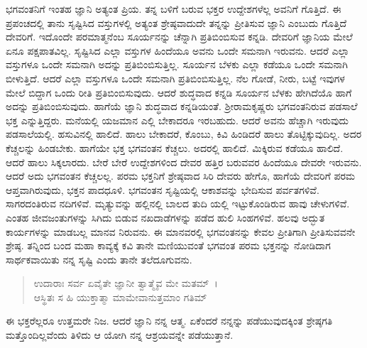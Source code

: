 ಭಗವಂತನಿಗೆ ಇಂತಹ ಜ್ಞಾನಿ ಅತ್ಯಂತ ಪ್ರಿಯ. ತನ್ನ ಬಳಿಗೆ ಬರುವ ಭಕ್ತರ ಉದ್ದೇಶಗಳೆಲ್ಲ ಅವನಿಗೆ ಗೊತ್ತಿದೆ. ಈ ಪ್ರಪಂಚದಲ್ಲಿ ತಾನು ಸೃಷ್ಟಿಸಿದ ವಸ್ತುಗಳಲ್ಲಿ ಅತ್ಯಂತ ಶ್ರೇಷ್ಠವಾದುದೇ ತನ್ನನ್ನು ಪ್ರೀತಿಸುವ ಜ್ಞಾನಿ ಎಂಬುದು ಗೊತ್ತಿದೆ ದೇವರಿಗೆ. ಇದೊಂದೇ ಪರಮಾತ್ಮನೆಂಬ ಸೂರ್ಯನನ್ನು ಚೆನ್ನಾಗಿ ಪ್ರತಿಬಿಂಬಿಸುವ ಕನ್ನಡಿ. ದೇವರಿಗೆ ಜ್ಞಾನಿಯ ಮೇಲೆ ಏನೂ ಪಕ್ಷಪಾತವಿಲ್ಲ. ಸೃಷ್ಟಿಸಿದ ಎಲ್ಲಾ ವಸ್ತುಗಳ ಹಿಂದೆಯೂ ಅವನು ಒಂದೇ ಸಮನಾಗಿ ಇರುವನು. ಆದರೆ ಎಲ್ಲಾ ವಸ್ತುಗಳೂ ಒಂದೇ ಸಮನಾಗಿ ಅದನ್ನು ಪ್ರತಿಬಿಂಬಿಸುತ್ತಿಲ್ಲ. ಸೂರ್ಯನ ಬೆಳಕು ಎಲ್ಲಾ ಕಡೆಯೂ ಒಂದೇ ಸಮನಾಗಿ ಬೀಳುತ್ತಿದೆ. ಆದರೆ ಎಲ್ಲಾ ವಸ್ತುಗಳೂ ಒಂದೇ ಸಮನಾಗಿ ಪ್ರತಿಬಿಂಬಿಸುತ್ತಿಲ್ಲ. ನೆಲ ಗೋಡೆ, ನೀರು, ಬಟ್ಟೆ ಇವುಗಳ ಮೇಲೆ ಬಿದ್ದಾಗ ಒಂದು ರೀತಿ ಪ್ರತಿಬಿಂಬಿಸುವುದು. ಆದರೆ ಶುದ್ಧವಾದ ಕನ್ನಡಿ ಸೂರ್ಯನ ಬೆಳಕು ಹೇಗಿದೆಯೊ ಹಾಗೆ ಅದನ್ನು ಪ್ರತಿಬಿಂಬಿಸುವುದು. ಹಾಗೆಯೆ ಜ್ಞಾನಿ ಶುದ್ಧವಾದ ಕನ್ನಡಿಯಂತೆ. ಶ‍್ರೀರಾಮಕೃಷ್ಣರು ಭಗವಂತನಿರುವ ಪಡಸಾಲೆ ಭಕ್ತ ಎನ್ನುತ್ತಿದ್ದರು. ಮನೆಯಲ್ಲಿ ಯಜಮಾನ ಎಲ್ಲಿ ಬೇಕಾದರೂ ಇರಬಹುದು. ಆದರೆ ಅವನು ಹೆಚ್ಚಾಗಿ ಇರುವುದು ಪಡಸಾಲೆಯಲ್ಲಿ. ಹಸುವಿನಲ್ಲಿ ಹಾಲಿದೆ. ಹಾಲು ಬೇಕಾದರೆ, ಕೊಂಬು, ಕಿವಿ ಹಿಂಡಿದರೆ ಹಾಲು ತೊಟ್ಟಿಕ್ಕುವುದಿಲ್ಲ. ಅದರ ಕೆಚ್ಚಲನ್ನು ಹಿಂಡಬೇಕು. ಹಾಗೆಯೇ ಭಕ್ತ ಭಗವಂತನ ಕೆಚ್ಚಲು. ಅದರಲ್ಲಿ ಹಾಲಿದೆ. ಮಿಕ್ಕಿರುವ ಕಡೆಯೂ ಹಾಲಿದೆ. ಆದರೆ ಹಾಲು ಸಿಕ್ಕಲಾರದು. ಬೇರೆ ಬೇರೆ ಉದ್ದೇಶಗಳಿಂದ ದೇವರ ಹತ್ತಿರ ಬರುವವರ ಹಿಂದೆಯೂ ದೇವರೇ ಇರುವನು. ಆದರೆ ಅದು ಭಗವಂತನ ಕೆಚ್ಚಲಲ್ಲ. ಪರಮ ಭಕ್ತನಿಗೆ ಶ್ರೇಷ್ಠವಾದ ಸಿರಿ ದೇವರು ಹೇಗೊ, ಹಾಗೆಯೆ ದೇವರಿಗೆ ಪರಮ ಆಪ್ತವಾಗಿರುವುದು, ಭಕ್ತನ ಪಾದಧೂಳಿ. ಭಗವಂತನ ಸೃಷ್ಟಿಯಲ್ಲಿ ಆಕಾಶವನ್ನು ಭೇದಿಸುವ ಪರ್ವತಗಳಿವೆ. ಸಾಗರದಂತಿರುವ ನದಿಗಳಿವೆ. ಮೃತ್ಯುವನ್ನು ಹಲ್ಲಿನಲ್ಲಿ ಬಾಲದ ತುದಿ ಯಲ್ಲಿ ಇಟ್ಟುಕೊಂಡಿರುವ ಹಾವು ಚೇಳುಗಳಿವೆ. ಎಂತಹ ಜೀವಜಂತುಗಳನ್ನು ಸಿಗಿದು ಬಿಡುವ ನಖದಾಡೆಗಳನ್ನು ಪಡೆದ ಹುಲಿ ಸಿಂಹಗಳಿವೆ. ಹಲವು ಅದ್ಭುತ ಕಾರ್ಯಗಳನ್ನು ಮಾಡಬಲ್ಲ ಮಾನವ ನಿರುವನು. ಈ ಮಾನವರಲ್ಲಿ ಭಗವಂತನನ್ನು ಕೇವಲ ಪ್ರೀತಿಗಾಗಿ ಪ್ರೀತಿಸುವವನೇ ಶ್ರೇಷ್ಠ. ತನ್ನಿಂದ ಬಂದ ಮಹಾ ಕಾವ್ಯಕ್ಕೆ ಕವಿ ತಾನೇ ಮಣಿಯುವಂತೆ ಭಗವಂತ ಪರಮ ಭಕ್ತನನ್ನು ನೋಡಿದಾಗ ಸಾರ್ಥಕವಾಯಿತು ನನ್ನ ಸೃಷ್ಟಿ ಎಂದು ತಾನೇ ತಲೆದೂಗುವನು.

\begin{verse}
ಉದಾರಾಃ ಸರ್ವ ಏವೈತೇ ಜ್ಞಾನೀ ತ್ವಾತ್ಮೈವ ಮೇ ಮತಮ್~।\\ಆಸ್ಥಿತಃ ಸ ಹಿ ಯುಕ್ತಾತ್ಮಾ ಮಾಮೇವಾನುತ್ತಮಾಂ ಗತಿಮ್ 
\end{verse}

{\small ಈ ಭಕ್ತರೆಲ್ಲರೂ ಉತ್ತಮರೇ ನಿಜ. ಆದರೆ ಜ್ಞಾನಿ ನನ್ನ ಆತ್ಮ. ಏಕೆಂದರೆ ನನ್ನನ್ನು ಪಡೆಯುವುದಕ್ಕಿಂತ ಶ್ರೇಷ್ಠಗತಿ ಮತ್ತೊಂದಿಲ್ಲವೆಂದು ತಿಳಿದು ಆ ಯೋಗಿ ನನ್ನ ಆಶ್ರಯವನ್ನೇ ಪಡೆಯುತ್ತಾನೆ.}

